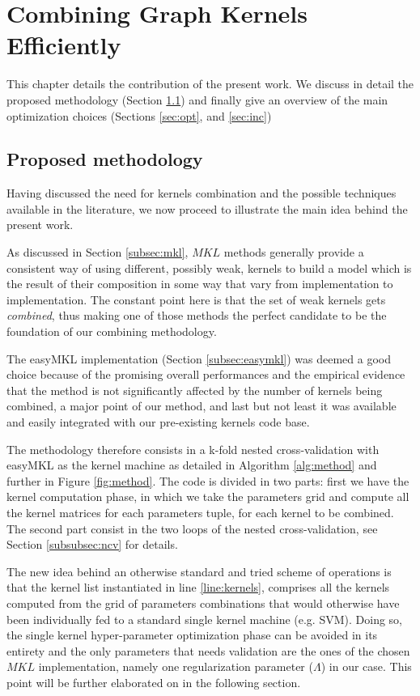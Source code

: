 \chapter{Combining Graph Kernels Efficiently}
\label{Chapter3}

This chapter details the contribution of the present work.
We discuss in detail the proposed methodology (Section \ref{sec:meth}) and
finally give an overview of the main optimization choices (Sections
\ref{sec:opt}, and \ref{sec:inc})

\section{Proposed methodology}
\label{sec:meth}

Having discussed the need for kernels combination and the possible techniques
available in the literature, we now proceed to illustrate the main idea behind
the present work.

As discussed in Section \ref{subsec:mkl}, $MKL$ methods generally provide a consistent
way of using different, possibly weak, kernels to build a model which is the result
of their composition in some way that vary from implementation to implementation.
The constant point here is that the set of weak kernels gets \emph{combined}, thus
making one of those methods the perfect candidate to be the foundation of our
combining methodology.

The easyMKL implementation (Section \ref{subsec:easymkl}) was deemed a good
choice because of the promising overall performances and the empirical evidence
that the method is not significantly affected by the number of kernels
being combined, a major point of our method, and last but not least it was
available and easily integrated with our pre-existing kernels code base.

The methodology therefore consists in a k-fold nested cross-validation with
easyMKL as the kernel machine as detailed in Algorithm \ref{alg:method} and further in
Figure \ref{fig:method}.
The code is divided in two parts: first we have the kernel computation phase,
in which we take the parameters grid and compute all the kernel matrices for each
parameters tuple, for each kernel to be combined.
The second part consist in the two loops of the nested cross-validation, see
Section \ref{subsubsec:ncv} for details.

The new idea behind an otherwise standard and tried scheme of operations is that
the kernel list instantiated in line \ref{line:kernels}, comprises all the 
kernels computed from the grid of parameters combinations that would otherwise
have been individually fed to a standard single kernel machine (e.g. SVM).
Doing so, the single kernel hyper-parameter optimization phase can be avoided in its
entirety and the only parameters that needs validation are the ones of the chosen
$MKL$ implementation, namely one regularization parameter ($\Lambda$) in our case.
This point will be further elaborated on in the following section.

